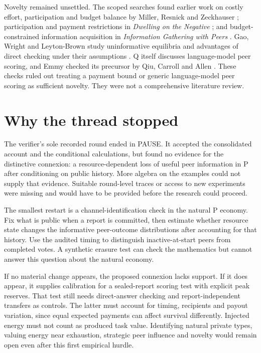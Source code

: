 \documentclass{article}
\begin{document}
Novelty remained unsettled.
The scoped searches found earlier work on costly effort, participation and budget balance by Miller, Resnick
and Zeckhauser \cite{miller}; participation and payment restrictions in \emph{Dwelling on the Negative}
\cite{witkowski}; and budget-constrained information acquisition in \emph{Information Gathering with Peers}
\cite{radanovic}.
Gao, Wright and Leyton-Brown study uninformative equilibria and advantages of direct checking under their assumptions \cite{gao}.
Q itself discusses language-model peer scoring, and Emmy checked its precursor by Qiu, Carroll and Allen \cite{qiu}.
These checks ruled out treating a payment bound or generic language-model peer scoring as sufficient novelty.
They were not a comprehensive literature review.

\section{Why the thread stopped}
The verifier's sole recorded round ended in PAUSE.
It accepted the consolidated account and the conditional calculations, but found no evidence for the
distinctive connexion: a resource-dependent loss of useful peer information in P after conditioning on public
history.
More algebra on the examples could not supply that evidence.
Suitable round-level traces or access to new experiments were missing and would have to be provided before the research could proceed.

The smallest restart is a channel-identification check in the natural P economy.
Fix what is public when a report is committed, then estimate whether resource state changes the informative
peer-outcome distributions after accounting for that history.
Use the audited timing to distinguish inactive-at-start peers from completed votes.
A synthetic erasure test can check the mathematics but cannot answer this question about the natural economy.

If no material change appears, the proposed connexion lacks support.
If it does appear, it supplies calibration for a sealed-report scoring test with explicit peak reserves.
That test still needs direct-answer checking and report-independent transfers as controls.
The latter must account for timing, recipients and payout variation, since equal expected payments can affect survival differently.
Injected energy must not count as produced task value.
Identifying natural private types, valuing energy near exhaustion, strategic peer influence and novelty would
remain open even after this first empirical hurdle.

\begingroup
\raggedright


\endgroup
\end{document}

